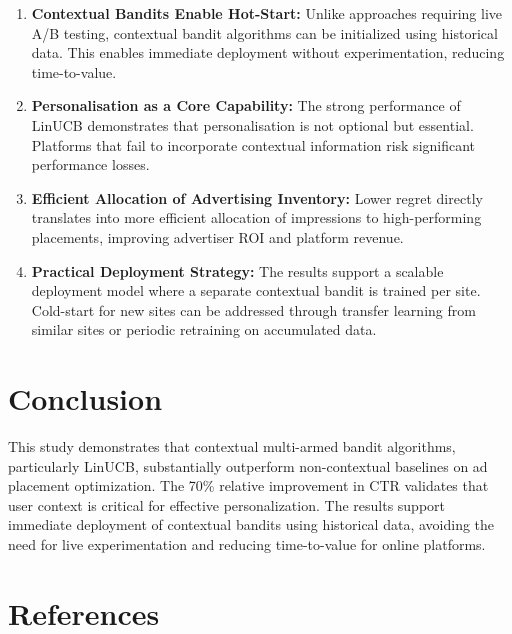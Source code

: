\documentclass[12pt]{article}
\begin{document}
\begin{enumerate}[label=\alph*.]

\item \textbf{Contextual Bandits Enable Hot-Start:} Unlike approaches requiring live A/B testing, contextual bandit algorithms can be initialized using historical data. This enables immediate deployment without experimentation, reducing time-to-value.

\item \textbf{Personalisation as a Core Capability:} The strong performance of LinUCB demonstrates that personalisation is not optional but essential. Platforms that fail to incorporate contextual information risk significant performance losses.

\item \textbf{Efficient Allocation of Advertising Inventory:} Lower regret directly translates into more efficient allocation of impressions to high-performing placements, improving advertiser ROI and platform revenue.

\item \textbf{Practical Deployment Strategy:} The results support a scalable deployment model where a separate contextual bandit is trained per site. Cold-start for new sites can be addressed through transfer learning from similar sites or periodic retraining on accumulated data.

\end{enumerate}

\section{Conclusion}

This study demonstrates that contextual multi-armed bandit algorithms, particularly LinUCB, substantially outperform non-contextual baselines on ad placement optimization. The 70\% relative improvement in CTR validates that user context is critical for effective personalization. The results support immediate deployment of contextual bandits using historical data, avoiding the need for live experimentation and reducing time-to-value for online platforms.

\newpage
\section*{References}
\end{document}
